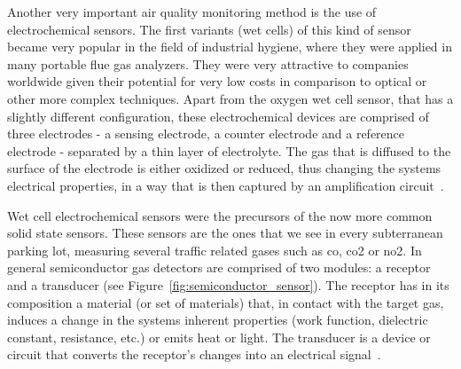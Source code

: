Another very important air quality monitoring method is the use of
electrochemical sensors. The first variants (wet cells) of this kind of
sensor became very popular in the field of industrial hygiene, where
they were applied in many portable flue gas analyzers. They were very
attractive to companies worldwide given their potential for very low
costs in comparison to optical or other more complex techniques. Apart
from the oxygen wet cell sensor, that has a slightly different
configuration, these electrochemical devices are comprised of three
electrodes - a sensing electrode, a counter electrode and a reference
electrode - separated by a thin layer of electrolyte. The gas that is
diffused to the surface of the electrode is either oxidized or reduced,
thus changing the systems electrical properties, in a way that is then
captured by an amplification circuit~\cite{Clark1997}.

Wet cell electrochemical sensors were the precursors of the now more
common solid state sensors. These sensors are the ones that we see in
every subterranean parking lot, measuring several traffic related gases
such as \gls{co}, \gls{co2} or \gls{no2}. In general semiconductor gas
detectors are comprised of two modules: a receptor and a transducer (see
Figure~\ref{fig:semiconductor_sensor}). The receptor has in its
composition a material (or set of materials) that, in contact with the
target gas, induces a change in the systems inherent properties (work
function, dielectric constant, resistance, etc.) or emits heat or light.
The transducer is a device or circuit that converts the receptor's
changes into an electrical signal~\cite{Clark1997, Bishop1996,
Vallero2014}.

